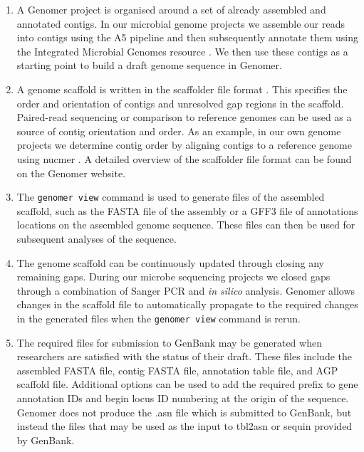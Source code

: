 \documentclass[10pt]{article}
\begin{document}
\begin{enumerate}

  \item{A Genomer project is organised around a set of already assembled and
  annotated contigs. In our microbial genome projects we assemble our reads
  into contigs using the A5 pipeline \cite{tritt2012} and then subsequently
  annotate them using the Integrated Microbial Genomes resource
  \cite{markowitz2006}. We then use these contigs as a starting point to build
  a draft genome sequence in Genomer.}

  \item{A genome scaffold is written in the scaffolder file format
  \cite{barton2012}. This specifies the order and orientation of contigs and
  unresolved gap regions in the scaffold. Paired-read sequencing or comparison
  to reference genomes can be used as a source of contig orientation and order.
  As an example, in our own genome projects we determine contig order by
  aligning contigs to a reference genome using nucmer \cite{kurtz2004}. A
  detailed overview of the scaffolder file format can be found on the Genomer
  website.}

  \item{The \verb+genomer view+ command is used to generate files of the
  assembled scaffold, such as the FASTA file of the assembly or a GFF3 file of
  annotations locations on the assembled genome sequence. These files can then
  be used for subsequent analyses of the sequence.}

  \item{The genome scaffold can be continuously updated through closing any
  remaining gaps. During our microbe sequencing projects we closed gaps through
  a combination of Sanger PCR and \emph{in silico} analysis. Genomer allows
  changes in the scaffold file to automatically propagate to the required
  changes in the generated files when the \verb+genomer view+ command is
  rerun.}

  \item{The required files for submission to GenBank may be generated when
  researchers are satisfied with the status of their draft. These files include
  the assembled FASTA file, contig FASTA file, annotation table file, and AGP
  scaffold file. Additional options can be used to add the required prefix to
  gene annotation IDs and begin locus ID numbering at the origin of the
  sequence. Genomer does not produce the .asn file which is submitted to
  GenBank, but instead the files that may be used as the input to tbl2asn or
  sequin provided by GenBank.}

\end{enumerate}
\end{document}
